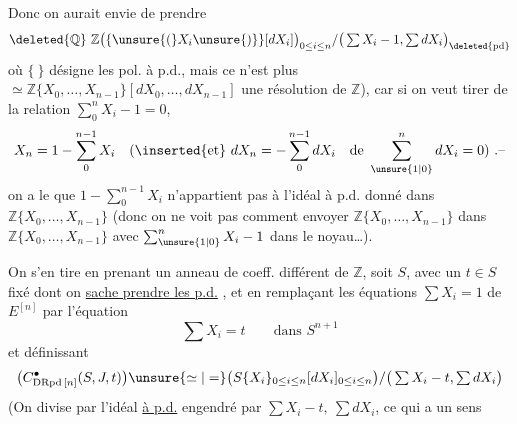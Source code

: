 Donc on aurait envie de prendre
\[
\deleted{\mathbb Q}\ \mathbb Z\big(\{\unsure{(}X_i\unsure{)}\}[dX_i]\big)_{0\leq i\leq n}/\big(\textstyle\sum X_i-1,\sum dX_i\big)_{\deleted{\mathrm{pd}}}
\]
où $\{\ \}$ désigne les pol. à p.d., mais ce n'est plus $\simeq\mathbb Z\{X_0,\ldots,X_{n-1}\}[dX_0,\ldots,dX_{n-1}]$   une résolution de $\mathbb Z$), car si on veut tirer de la relation $\sum_0^n X_i-1=0$,
\[
X_n=1-\sum_0^{n-1}X_i\quad(\inserted{\text{et}}\ dX_n=-\sum_0^{n-1}dX_i\quad\text{de }\sum_{\unsure{1|0}}^n dX_i=0)\ .\text{--}
\]
on a le  que $1-\sum_0^{n-1}X_i$ n'appartient pas à l'idéal à p.d. donné dans $\mathbb Z\{X_0,\ldots,X_{n-1}\}$ (donc on ne voit pas comment envoyer $\mathbb Z\{X_0,\ldots,X_{n-1}\}$ dans $\mathbb Z\{X_0,\ldots,X_{n-1}\}$ avec   $\sum_{\unsure{1|0}}^n X_i-1$ dans le noyau\ldots).

On s'en tire en prenant un anneau de coeff. différent de $\mathbb Z$, soit $S$, avec un  $t\in S$ fixé dont on \uline{sache prendre les p.d.} , et en remplaçant les équations $\sum X_i=1$ de $E^{[n]}$ par l'équation
\[
\sum X_i=t\qquad\text{dans } S^{n+1}
\]
et définissant
\[
\big(C^\bullet_{\mathrm{DRpd}\,[n]}(S,J,t)\big)\unsure{\simeq|=}
\big(S\{X_i\}_{0\leq i\leq n}[dX_i]_{0\leq i\leq n}\big)/
\big(\textstyle\sum X_i-t,\sum dX_i\big)
\]
(On divise par l'idéal \uline{à p.d.} engendré  par $\sum X_i-t,\ \sum dX_i$, ce qui a un sens
